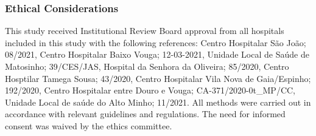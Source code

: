 \subsubsection{Ethical Considerations}
This study received Institutional Review Board approval from all hospitals included in this study with the following references: Centro Hospitalar S{\~{a}}o Jo{\~{a}}o; 08/2021, Centro Hospitalar Baixo Vouga; 12-03-2021, Unidade Local de Sa\'{u}de de Matosinho; 39/CES/JAS, Hospital da Senhora da Oliveira; 85/2020, Centro Hosptilar Tamega Sousa; 43/2020, Centro Hospitalar Vila Nova de Gaia/Espinho; 192/2020, Centro Hospitalar entre Douro e Vouga; CA-371/2020-0t\_MP/CC, Unidade Local de sa\'{u}de do Alto Minho; 11/2021. All methods were carried out in accordance with relevant guidelines and regulations.  The need for informed consent was waived by the ethics committee. 
    